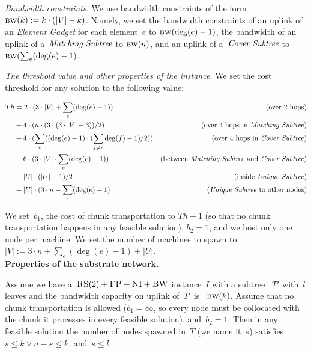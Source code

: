 \documentclass[preprint,12pt]{elsarticle}
\newcommand{\CC}{\textsc{NI}}
\newcommand{\FP}{\textsc{FP}}
\newcommand{\RS}{\textsc{RS}}
\newcommand{\BW}{\textsc{BW}}
\newcommand{\numNodes}{\ensuremath{|V|}}
\newcommand{\UnqSubtree}{{{\emph{Unique Subtree}}}}
\newcommand{\MatchSubtree}{{\emph{Matching Subtree}}}
\newcommand{\CoverSubtree}{{\emph{Cover Subtree}}}
\newcommand{\ElGadget}{{\emph{Element Gadget}}}
\newcommand{\Band}{\textsc{bw}}
\newcommand{\CostTrans}{\ensuremath{b_1}}
\newcommand{\CostCom}{\ensuremath{b_2}}
\newcommand{\Thr}{\ensuremath{Th}}
\begin{document}
\emph{Bandwidth constraints.}
We use bandwidth constraints of the form
$\Band(k) := k\cdot(\numNodes - k)$. Namely, we set the bandwidth
constraints of an uplink of an {\ElGadget} for each element~$e$ to 
$\Band(\deg(e)-1)$, the bandwidth of an uplink of a~$\MatchSubtree$ to 
$\Band(n)$, and an uplink of a~$\CoverSubtree$ to 
$\Band(\sum_e (\deg(e)-1)$.

\emph{The threshold value and other properties of the instance.} We set the
cost threshold for any solution to the following value:

\begin{tiny}
\begin{align*}
  \Thr  & = 2\cdot (3\cdot \numNodes + \sum_e (\deg(e) - 1)) & \mbox{(over 2 hops)}\\
        & + 4\cdot (n\cdot (3 \cdot (3\cdot \numNodes - 3)) / 2) & \mbox{(over 4 hops in {\MatchSubtree})}\\
        & + 4\cdot (\sum_e((\deg(e) - 1)\cdot (\sum_{f\neq e} \deg(f) - 1)/2)) & \mbox{(over 4 hops in {\CoverSubtree})}\\
        & + 6\cdot (3\cdot \numNodes \cdot \sum_e(\deg(e) - 1)) & \mbox{(between {\MatchSubtree} and {\CoverSubtree})} \\
        & + |U|\cdot (|U|-1)/2 & \mbox{(inside {\UnqSubtree})} \\
        & + |U| \cdot (3\cdot n + \sum_e (\deg(e)-1) & \mbox{({\UnqSubtree} to other nodes)} \\
\end{align*}
\end{tiny}

  We
set~$\CostTrans$, the cost of chunk transportation to $\Thr+1$ (so that no chunk transportation happens in any feasible solution), 
$\CostCom = 1$, and we host only one node per machine. We set the
number of machines to spawn to:
$\numNodes := 3\cdot n + \sum_e (\deg(e)-1) + |U|$.
\\

\noindent \textbf{Properties of the substrate network.}
\begin{lemma}
  Assume we have a~$\RS(2)+\FP+\CC+\BW$ instance~$I$ with a subtree
 ~$T'$ with~$l$ leaves and the bandwidth capacity on uplink of~$T'$ is
 ~$\Band(k)$. Assume that no chunk transportation is allowed
  ($\CostTrans = \infty$, so every node must be collocated with the
  chunk it processes in every feasible solution), and~$\CostCom = 1$.
  Then in any feasible solution the number of nodes spawned in~$T$ (we
  name it~$s$) satisfies~$s \leq k \vee n-s\leq k$, and~$s \leq l$.
  \label{lem:bandwidth1}
\end{lemma}
\end{document}
